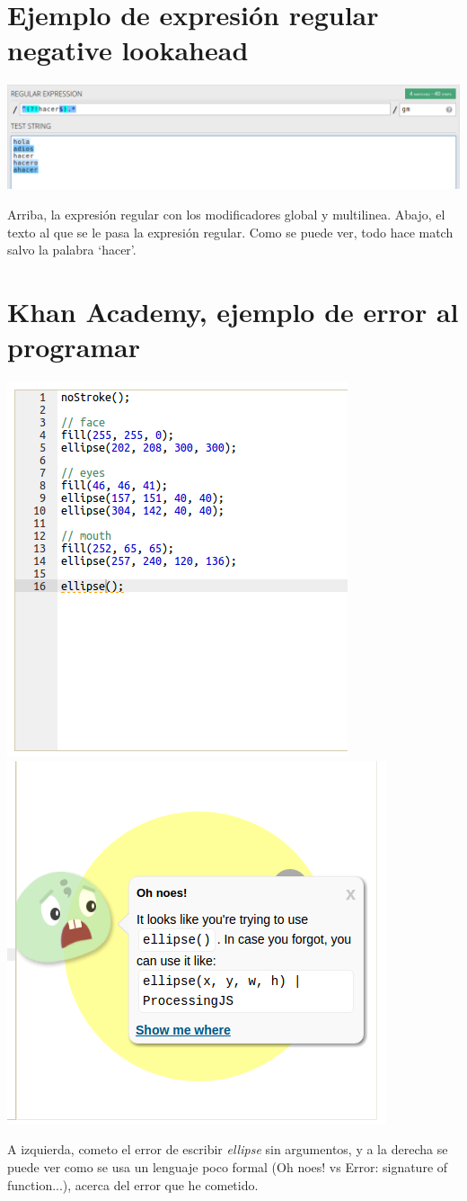\documentclass{report}
\begin{document}
	\chapter{Ejemplo de expresión regular negative lookahead} \label{app:c}
	
	\begin{center}
		\includegraphics[width=1\linewidth]{negativelookahead}
		
		Arriba, la expresión regular con los modificadores global y multilinea.
		Abajo, el texto al que se le pasa la expresión regular. Como se puede ver, todo hace match salvo la palabra `hacer'.
	\end{center}
	
	\chapter{Khan Academy, ejemplo de error al programar} \label{app:d}
	
	\begin{center}
	\includegraphics[width=0.45\linewidth]{khanerror}
	\includegraphics[width=0.45\linewidth]{khanerror2}
	
	A izquierda, cometo el error de escribir \textit{ellipse} sin argumentos, y a la derecha se puede ver como se usa un lenguaje poco formal (Oh noes! vs Error: signature of function...), acerca del error que he cometido.
	\end{center}
	
\end{document}
